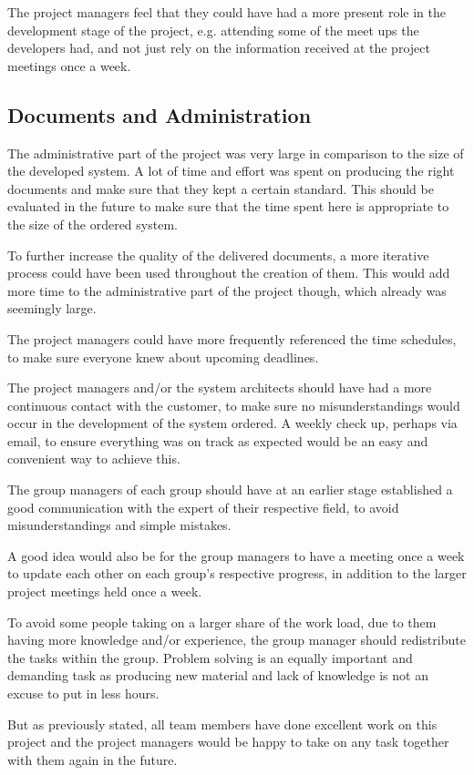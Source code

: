 \documentclass[a4paper]{article}
\begin{document}
The project managers feel that they could have had a more present role in the development stage of the project, e.g. attending some of the meet ups the developers had, and not just rely on the information received at the project meetings once a week. 

\subsection{Documents and Administration}
The administrative part of the project was very large in comparison to the size of the developed system. A lot of time and effort was spent on producing the right documents and make sure that they kept a certain standard. This should be evaluated in the future to make sure that the time spent here is appropriate to the size of the ordered system.

To further increase the quality of the delivered documents, a more iterative process could have been used throughout the creation of them. This would add more time to the administrative part of the project though, which already was seemingly large.

The project managers could have more frequently referenced the time schedules, to make sure everyone knew about upcoming deadlines.

The project managers and/or the system architects should have had a more continuous contact with the customer, to make sure no misunderstandings would occur in the development of the system ordered. A weekly check up, perhaps via email, to ensure everything was on track as expected would be an easy and convenient way to achieve this. 

The group managers of each group should have at an earlier stage established a good communication with the expert of their respective field, to avoid misunderstandings and simple mistakes. 

A good idea would also be for the group managers to have a meeting once a week to update each other on each group's respective progress, in addition to the larger project meetings held once a week. 

To avoid some people taking on a larger share of the work load, due to them having more knowledge and/or experience, the group manager should redistribute the tasks within the group. Problem solving is an equally important and demanding task as producing new material and lack of knowledge is not an excuse to put in less hours.

But as previously stated, all team members have done excellent work on this project and the project managers would be happy to take on any task together with them again in the future.
\end{document}
